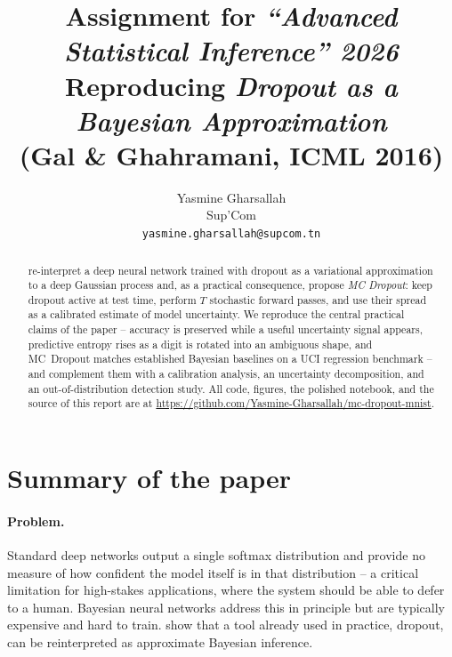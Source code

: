 \documentclass{article}
\title{Assignment for \emph{``Advanced Statistical Inference'' 2026}\\
Reproducing \emph{Dropout as a Bayesian Approximation}\\(Gal \& Ghahramani, ICML 2016)}
\author{%
  Yasmine Gharsallah \\
  Sup'Com \\
  \texttt{yasmine.gharsallah@supcom.tn} \\
}
\begin{document}
\maketitle

\begin{abstract}
\citet{gal2016dropout} re-interpret a deep neural network trained with dropout as a variational approximation to a deep Gaussian process and, as a practical consequence, propose \emph{MC Dropout}: keep dropout active at test time, perform $T$ stochastic forward passes, and use their spread as a calibrated estimate of model uncertainty. We reproduce the central practical claims of the paper -- accuracy is preserved while a useful uncertainty signal appears, predictive entropy rises as a digit is rotated into an ambiguous shape, and MC~Dropout matches established Bayesian baselines on a UCI regression benchmark -- and complement them with a calibration analysis, an uncertainty decomposition, and an out-of-distribution detection study. All code, figures, the polished notebook, and the source of this report are at
\url{https://github.com/Yasmine-Gharsallah/mc-dropout-mnist}.
\end{abstract}

\section{Summary of the paper}

\paragraph{Problem.} Standard deep networks output a single softmax distribution and provide no measure of how confident the model itself is in that distribution -- a critical limitation for high-stakes applications, where the system should be able to defer to a human. Bayesian neural networks address this in principle but are typically expensive and hard to train. \citet{gal2016dropout} show that a tool already used in practice, dropout, can be reinterpreted as approximate Bayesian inference.
\end{document}
